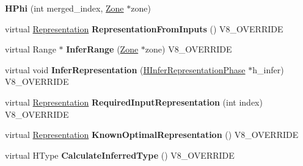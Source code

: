 \begin{DoxyCompactItemize}
\item 
\hypertarget{classv8_1_1internal_1_1_v8___f_i_n_a_l_a5e89bbb31503b6cb31f740ef23a77ed0}{}{\bfseries H\+Phi} (int merged\+\_\+index, \hyperlink{classv8_1_1internal_1_1_zone}{Zone} $\ast$zone)\label{classv8_1_1internal_1_1_v8___f_i_n_a_l_a5e89bbb31503b6cb31f740ef23a77ed0}

\item 
\hypertarget{classv8_1_1internal_1_1_v8___f_i_n_a_l_adf198742368d46a5275c303414fdfc1d}{}virtual \hyperlink{classv8_1_1internal_1_1_representation}{Representation} {\bfseries Representation\+From\+Inputs} () V8\+\_\+\+O\+V\+E\+R\+R\+I\+D\+E\label{classv8_1_1internal_1_1_v8___f_i_n_a_l_adf198742368d46a5275c303414fdfc1d}

\item 
\hypertarget{classv8_1_1internal_1_1_v8___f_i_n_a_l_a7d7c752019e44fc1ba3895619da6a7f5}{}virtual Range $\ast$ {\bfseries Infer\+Range} (\hyperlink{classv8_1_1internal_1_1_zone}{Zone} $\ast$zone) V8\+\_\+\+O\+V\+E\+R\+R\+I\+D\+E\label{classv8_1_1internal_1_1_v8___f_i_n_a_l_a7d7c752019e44fc1ba3895619da6a7f5}

\item 
\hypertarget{classv8_1_1internal_1_1_v8___f_i_n_a_l_af3bdd2a407d823e317547d7f761a77c7}{}virtual void {\bfseries Infer\+Representation} (\hyperlink{classv8_1_1internal_1_1_h_infer_representation_phase}{H\+Infer\+Representation\+Phase} $\ast$h\+\_\+infer) V8\+\_\+\+O\+V\+E\+R\+R\+I\+D\+E\label{classv8_1_1internal_1_1_v8___f_i_n_a_l_af3bdd2a407d823e317547d7f761a77c7}

\item 
\hypertarget{classv8_1_1internal_1_1_v8___f_i_n_a_l_a6c6d1f37f40b113d8f4062f1ffff7215}{}virtual \hyperlink{classv8_1_1internal_1_1_representation}{Representation} {\bfseries Required\+Input\+Representation} (int index) V8\+\_\+\+O\+V\+E\+R\+R\+I\+D\+E\label{classv8_1_1internal_1_1_v8___f_i_n_a_l_a6c6d1f37f40b113d8f4062f1ffff7215}

\item 
\hypertarget{classv8_1_1internal_1_1_v8___f_i_n_a_l_a03cf853403dec841cfc7e6277aaf3279}{}virtual \hyperlink{classv8_1_1internal_1_1_representation}{Representation} {\bfseries Known\+Optimal\+Representation} () V8\+\_\+\+O\+V\+E\+R\+R\+I\+D\+E\label{classv8_1_1internal_1_1_v8___f_i_n_a_l_a03cf853403dec841cfc7e6277aaf3279}

\item 
\hypertarget{classv8_1_1internal_1_1_v8___f_i_n_a_l_a7a6782b8660ab150601db2ff28262edd}{}virtual H\+Type {\bfseries Calculate\+Inferred\+Type} () V8\+\_\+\+O\+V\+E\+R\+R\+I\+D\+E\label{classv8_1_1internal_1_1_v8___f_i_n_a_l_a7a6782b8660ab150601db2ff28262edd}


\end{DoxyCompactItemize}
